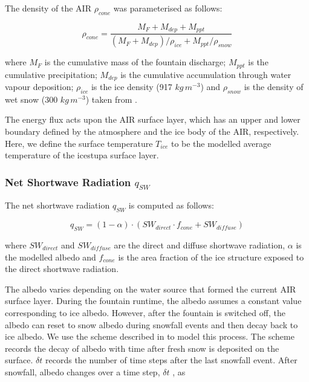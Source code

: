 The density of the AIR $\rho_{cone}$ was parameterised as follows:

\begin{equation}
  \rho_{cone} = \frac{M_{F} + M_{dep} + M_{ppt}}{(M_{F} + M_{dep})/\rho_{ice} + M_{ppt}/\rho_{snow}}
\end{equation}

where $M_F$ is the cumulative mass of the fountain discharge; $M_{ppt}$ is the cumulative precipitation;
$M_{dep}$ is the cumulative accumulation through water vapour deposition; $\rho_{ice}$ is the ice density (917
$kg\,m^{-3}$) and $\rho_{snow}$ is the density of wet snow (300 $kg\,m^{-3}$) taken from
\cite{cuffeyPhysicsGlaciers2010} .

The energy flux acts upon the AIR surface layer, which has an upper and lower boundary defined by the atmosphere
and the ice body of the AIR, respectively. Here, we define the surface temperature $T_{ice}$ to be the modelled
average temperature of the icestupa surface layer.

\subsubsection{Net Shortwave Radiation \texorpdfstring{$q_{SW}$}{Lg}} \label{sec:SW}

The net shortwave radiation $q_{SW}$ is computed as follows:

\begin{equation} q_{SW} = (1- \alpha)\cdot (SW_{direct} \cdot f_{cone} + SW_{diffuse}) \label{eqn:SW} \end{equation}

where $SW_{direct}$ and $SW_{diffuse}$ are the direct and diffuse shortwave radiation, $\alpha$ is the
modelled albedo and $f_{cone}$ is the area fraction of the ice structure exposed to the direct shortwave
radiation.

The albedo varies depending on the water source that formed the current AIR surface layer. During the fountain
runtime, the albedo assumes a constant value corresponding to ice albedo. However, after the fountain is
switched off, the albedo can reset to snow albedo during snowfall events and then decay back to ice albedo. We
use the scheme described in \cite{oerlemansYearRecordGlobal1998} to model this process. The scheme records the
decay of albedo with time after fresh snow is deposited on the surface. $\delta t$ records the number of time
steps after the last snowfall event. After snowfall, albedo changes over a time step, $\delta t$ , as

